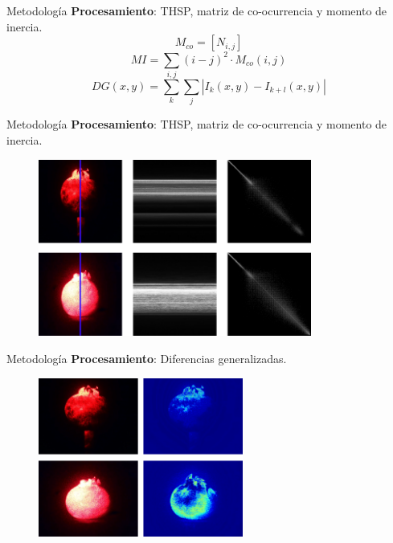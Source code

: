 \documentclass{beamer}
\begin{document}
\begin{frame}{Metodología}
    \textbf{Procesamiento}: THSP, matriz de co-ocurrencia y momento de inercia.
    \begin{equation*}
        M_{co} = [N_{i,j}]
    \end{equation*}
    \begin{equation*}
        MI = \sum_{i,j} (i - j)^2 \cdot M_{co}(i,j)
    \end{equation*}
    \begin{equation*}
        DG(x,y) = \sum_{k} \sum_{j} |I_{k}(x,y) - I_{k+l}(x,y)|
    \end{equation*}
\end{frame}

\begin{frame}{Metodología}
    \textbf{Procesamiento}: THSP, matriz de co-ocurrencia y momento de inercia.
    \begin{figure}
        \includegraphics[width=0.8\textwidth]{THSPMCO.png}
    \end{figure}
\end{frame}

\begin{frame}{Metodología}
    \textbf{Procesamiento}: Diferencias generalizadas.
    \begin{figure}
        \includegraphics[width=0.6\textwidth]{Gd.png}
    \end{figure}
\end{frame}
\end{document}
